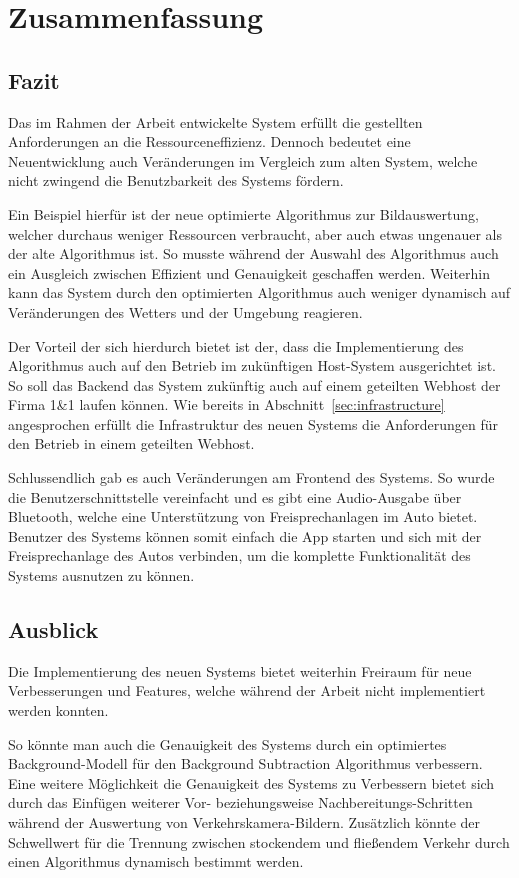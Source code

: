 \chapter{Zusammenfassung}

\section{Fazit}
Das im Rahmen der Arbeit entwickelte System erfüllt die gestellten Anforderungen an die Ressourceneffizienz.
Dennoch bedeutet eine Neuentwicklung auch Veränderungen im Vergleich zum alten System, welche nicht zwingend die Benutzbarkeit des Systems fördern.

Ein Beispiel hierfür ist der neue optimierte Algorithmus zur Bildauswertung, welcher durchaus weniger Ressourcen verbraucht, aber auch etwas ungenauer als der alte Algorithmus ist.
So musste während der Auswahl des Algorithmus auch ein Ausgleich zwischen Effizient und Genauigkeit geschaffen werden.
Weiterhin kann das System durch den optimierten Algorithmus auch weniger dynamisch auf Veränderungen des Wetters und der Umgebung reagieren.

Der Vorteil der sich hierdurch bietet ist der, dass die Implementierung des Algorithmus auch auf den Betrieb im zukünftigen Host-System ausgerichtet ist.
So soll das Backend das System zukünftig auch auf einem geteilten Webhost der Firma 1\&1 laufen können.
Wie bereits in Abschnitt~\ref{sec:infrastructure} angesprochen erfüllt die Infrastruktur des neuen Systems die Anforderungen für den Betrieb in einem geteilten Webhost.

Schlussendlich gab es auch Veränderungen am Frontend des Systems.
So wurde die Benutzerschnittstelle vereinfacht und es gibt eine Audio-Ausgabe über Bluetooth, welche eine Unterstützung von Freisprechanlagen im Auto bietet.
Benutzer des Systems können somit einfach die App starten und sich mit der Freisprechanlage des Autos verbinden, um die komplette Funktionalität des Systems ausnutzen zu können.
\newpage

\section{Ausblick}
Die Implementierung des neuen Systems bietet weiterhin Freiraum für neue Verbesserungen und Features, welche während der Arbeit nicht implementiert werden konnten.

So könnte man auch die Genauigkeit des Systems durch ein optimiertes Background-Modell für den Background Subtraction Algorithmus verbessern.
Eine weitere Möglichkeit die Genauigkeit des Systems zu Verbessern bietet sich durch das Einfügen weiterer Vor- beziehungsweise Nachbereitungs-Schritten während der Auswertung von Verkehrskamera-Bildern.
Zusätzlich könnte der Schwellwert für die Trennung zwischen stockendem und fließendem Verkehr durch einen Algorithmus dynamisch bestimmt werden.

